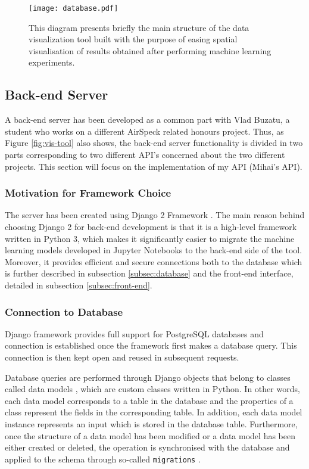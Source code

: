 \documentclass[bsc,frontabs,twoside,singlespacing,parskip,deptreport]{infthesis}     %
\begin{document}
\begin{figure}[h!]
  \center
  \texttt{[image: database.pdf]}
  \caption{This diagram presents briefly the main structure of the data visualization tool built with the purpose of easing spatial visualisation of results obtained after performing machine learning experiments.}
  \label{fig:database}
\end{figure}

\subsection{Back-end Server}
\label{subsec:back-end}

A back-end server has been developed as a common part with Vlad Buzatu, a student who works on a different AirSpeck related honours project. Thus, as Figure \ref{fig:vis-tool} also shows, the back-end server functionality is divided in two parts corresponding to two different API's concerned about the two different projects. This section will focus on the implementation of my API (Mihai's API).

\subsubsection*{Motivation for Framework Choice}

The server has been created using Django 2 Framework \cite{django}. The main reason behind choosing Django 2 for back-end development is that it is a high-level framework written in Python 3, which makes it significantly easier to migrate the machine learning models developed in Jupyter Notebooks to the back-end side of the tool. Moreover, it provides efficient and secure connections both to the database which is further described in subsection \ref{subsec:database} and the front-end interface, detailed in subsection \ref{subsec:front-end}.

\subsubsection*{Connection to Database}

Django framework provides full support for PostgreSQL databases and connection is established once the framework first makes a database query. This connection is then kept open and reused in subsequent requests.

Database queries are performed through Django objects that belong to classes called data models \cite{django-queries}, which are custom classes written in Python. In other words, each data model corresponds to a table in the database and the properties of a class represent the fields in the corresponding table. In addition, each data model instance represents an input which is stored in the database table. Furthermore, once the structure of a data model has been modified or a data model has been either created or deleted, the operation is synchronised with the database and applied to the schema through so-called \texttt{migrations} \cite{django-migrations}.
\end{document}
